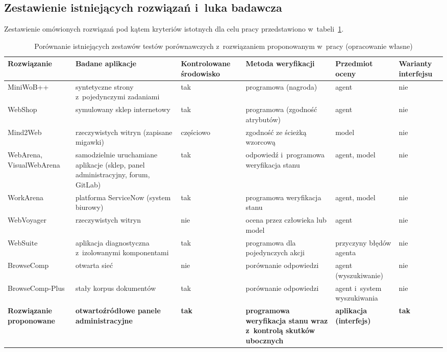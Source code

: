 \subsection{Zestawienie istniejących rozwiązań i~luka badawcza}
\label{sec:luka}
Zestawienie omówionych rozwiązań pod kątem kryteriów istotnych dla celu pracy przedstawiono w~tabeli~\ref{tab:porownanie}.

\begin{table}[H]
\centering
\caption{Porównanie istniejących zestawów testów porównawczych z~rozwiązaniem proponowanym w~pracy (opracowanie własne)}
\label{tab:porownanie}
\scriptsize
\begin{tabularx}{\textwidth}{>{\raggedright\arraybackslash}p{2.0cm}>{\raggedright\arraybackslash}X>{\raggedright\arraybackslash}p{1.6cm}>{\raggedright\arraybackslash}X>{\raggedright\arraybackslash}p{1.9cm}>{\raggedright\arraybackslash}p{1.5cm}}
\toprule
\textbf{Rozwiązanie} & \textbf{Badane aplikacje} & \textbf{Kontrolowane środowisko} & \textbf{Metoda weryfikacji} & \textbf{Przedmiot oceny} & \textbf{Warianty interfejsu} \\
\midrule
MiniWoB++ & syntetyczne strony z~pojedynczymi zadaniami & tak & programowa (nagroda) & agent & nie \\
WebShop & symulowany sklep internetowy & tak & programowa (zgodność atrybutów) & agent & nie \\
Mind2Web & 137 rzeczywistych witryn (zapisane migawki) & częściowo & zgodność ze ścieżką wzorcową & model & nie \\
WebArena, VisualWebArena & samodzielnie uruchamiane aplikacje (sklep, panel administracyjny, forum, GitLab) & tak & odpowiedź i~programowa weryfikacja stanu & agent, model & nie \\
WorkArena & platforma ServiceNow (system biurowy) & tak & programowa weryfikacja stanu & agent, model & nie \\
WebVoyager & 15 rzeczywistych witryn & nie & ocena przez człowieka lub model & agent & nie \\
WebSuite & aplikacja diagnostyczna z~izolowanymi komponentami & tak & programowa dla pojedynczych akcji & przyczyny błędów agenta & nie \\
BrowseComp & otwarta sieć & nie & porównanie odpowiedzi & agent (wyszukiwanie) & nie \\
BrowseComp-Plus & stały korpus dokumentów & tak & porównanie odpowiedzi & agent i~system wyszukiwania & nie \\
\midrule
\textbf{Rozwiązanie proponowane} & \textbf{otwartoźródłowe panele administracyjne} & \textbf{tak} & \textbf{programowa weryfikacja stanu wraz z~kontrolą skutków ubocznych} & \textbf{aplikacja (interfejs)} & \textbf{tak} \\
\bottomrule
\end{tabularx}
\end{table}

